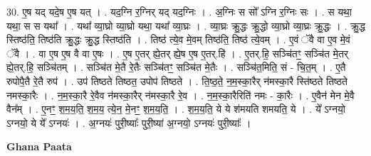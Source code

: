 \documentclass[17pt]{extarticle}
\begin{document}
30. ए॒ष यद् यदे॒ष ए॒ष यत् । . यद॒ग्नि र॒ग्निर् यद् यद॒ग्निः । . अ॒ग्निः स सो᳚ ऽग्नि र॒ग्निः सः । . स यथा॒ यथा॒ स स यथा᳚ । . यथा᳚ व्या॒घ्रो व्या॒घ्रो यथा॒ यथा᳚ व्या॒घ्रः । . व्या॒घ्रः क्रु॒द्धः क्रु॒द्धो व्या॒घ्रो व्या॒घ्रः क्रु॒द्धः । . क्रु॒द्ध स्तिष्ठ॑ति॒ तिष्ठ॑ति क्रु॒द्धः क्रु॒द्ध स्तिष्ठ॑ति । . तिष्ठ॑ त्ये॒व मे॒वम् तिष्ठ॑ति॒ तिष्ठ॑ त्ये॒वम् । . ए॒वं ॅवै वा ए॒व मे॒वं ॅवै । . वा ए॒ष ए॒ष वै वा ए॒षः । . ए॒ष ए॒तर् ह्ये॒तर् ह्ये॒ष ए॒ष ए॒तर्.हि॑ । . ए॒तर्.हि॒ सञ्चि॑तꣳ॒॒ सञ्चि॑त मे॒तर् ह्ये॒तर्.हि॒ सञ्चि॑तम् । . सञ्चि॑त मे॒तै रे॒तैः सञ्चि॑तꣳ॒॒ सञ्चि॑त मे॒तैः । . सञ्चि॑त॒मिति॒ सं - चि॒त॒म् । . ए॒तै रुपोपै॒तै रे॒तै रुप॑ । . उप॑ तिष्ठते तिष्ठत॒ उपोप॑ तिष्ठते । . ति॒ष्ठ॒ते॒ न॒म॒स्का॒रैर् न॑मस्का॒रै स्ति॑ष्ठते तिष्ठते नमस्का॒रैः । . न॒म॒स्का॒रै रे॒वैव न॑मस्का॒रैर् न॑मस्का॒रै रे॒व । . न॒म॒स्का॒रैरिति॑ नमः - का॒रैः । . ए॒वैन॑ मेन मे॒वै वैन᳚म् । . ए॒नꣳ॒॒ श॒म॒य॒ति॒ श॒म॒य॒ त्ये॒न॒ मे॒नꣳ॒॒ श॒म॒य॒ति॒ । . श॒म॒य॒ति॒ ये ये श॑मयति शमयति॒ ये । . ये᳚ ऽग्नयो॒ ऽग्नयो॒ ये ये᳚ ऽग्नयः॑ । . अ॒ग्नयः॑ पुरी॒ष्याः᳚ पुरी॒ष्या॑ अ॒ग्नयो॒ ऽग्नयः॑ पुरी॒ष्याः᳚ । \newline

\textbf{Ghana Paata } \newline
\end{document}
